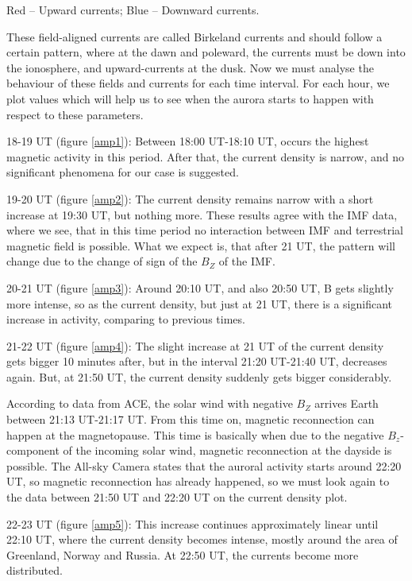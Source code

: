 \documentclass[10pt,a4paper]{article}
\begin{document}
Red – Upward currents;
Blue – Downward currents.


These field-aligned currents are called Birkeland currents and should follow a certain pattern, where at the dawn and poleward, the currents must be down into the ionosphere, and upward-currents at the dusk. Now we must analyse the behaviour of these fields and currents for each time interval. For each hour, we plot values which will help us to see when the aurora starts to happen with respect to these parameters.


18-19 UT (figure \ref{amp1}): Between 18:00 UT-18:10 UT, occurs the highest magnetic activity in this period. After that, the current density is narrow, and no significant phenomena for our case is suggested.


19-20 UT (figure \ref{amp2}): The current density remains narrow with a short increase at 19:30 UT, but nothing more. These results agree with the IMF data, where we see, that in this time period no interaction between IMF and terrestrial magnetic field is possible. What we expect is, that after 21 UT, the pattern will change due to the change of sign of the $B_Z$ of the IMF.


20-21 UT (figure \ref{amp3}): Around 20:10 UT, and also 20:50 UT, B gets slightly more intense, so as the current density, but just at 21 UT, there is a significant increase in activity, comparing to previous times.


21-22 UT (figure \ref{amp4}): The slight increase at 21 UT of the current density gets bigger 10 minutes after, but in the interval 21:20 UT-21:40 UT, decreases again. But, at 21:50 UT, the current density suddenly gets bigger considerably.


According to data from ACE, the solar wind with negative $B_Z$ arrives Earth between 21:13 UT-21:17 UT. From this time on, magnetic reconnection can happen at the magnetopause. This time is basically when due to the negative  $B_z$-component of the incoming solar wind, magnetic reconnection at the dayside is possible. The All-sky Camera states that the auroral activity starts around 22:20 UT, so magnetic reconnection has already happened, so we must look again to the data between 21:50 UT and 22:20 UT on the current density plot.


22-23 UT (figure \ref{amp5}): This increase continues approximately linear until 22:10 UT, where the current density becomes intense, mostly around the area of Greenland, Norway and Russia. At 22:50 UT, the currents become more distributed.
\end{document}
